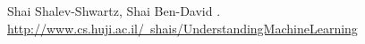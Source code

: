 \documentclass{article}
\begin{document}
\begin{thebibliography}{10}

		Shai Shalev-Shwartz, Shai Ben-David
		. \\
		\href{http://www.cs.huji.ac.il/~shais/UnderstandingMachineLearning}{http://www.cs.huji.ac.il/~shais/UnderstandingMachineLearning}

\end{thebibliography}
\end{document}
